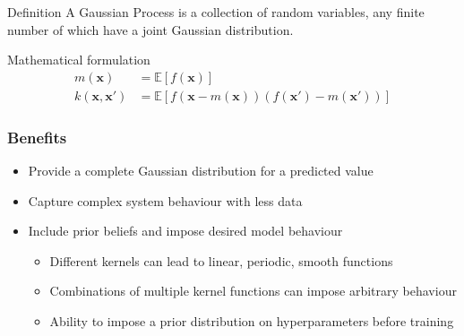 \begin{frame}
    \begin{block}{Definition}
        A Gaussian Process is a collection of random variables, any finite
        number of which have a joint Gaussian distribution.
    \end{block}
    \begin{block}{Mathematical formulation}
        \begin{equation*}
                \begin{aligned}
                    m(\mathbf{x}) &= \mathbb{E}[f(\mathbf{x})] \\
                    k(\mathbf{x}, \mathbf{x'}) &= \mathbb{E}[f(\mathbf{x} -
                    m(\mathbf{x}))(f(\mathbf{x'}) - m(\mathbf{x'}))]
                \end{aligned}
        \end{equation*}
    \end{block}
\end{frame}

\begin{frame}
    \frametitle{Benefits}
    \begin{itemize}
        \item Provide a complete Gaussian distribution for a predicted value
            \vspace{10pt} \pause
        \item Capture complex system behaviour with less data \vspace{10pt}
            \pause
        \item Include prior beliefs and impose desired model behaviour
            \vspace{10pt} \pause
            \begin{itemize}
                \item Different kernels can lead to linear, periodic, smooth
                    functions \vspace{10pt}
                \item Combinations of multiple kernel functions can impose
                    arbitrary behaviour \vspace{10pt}
                \item Ability to impose a prior distribution on hyperparameters
                    before training \vspace{10pt}
            \end{itemize}
    \end{itemize}
\end{frame}


